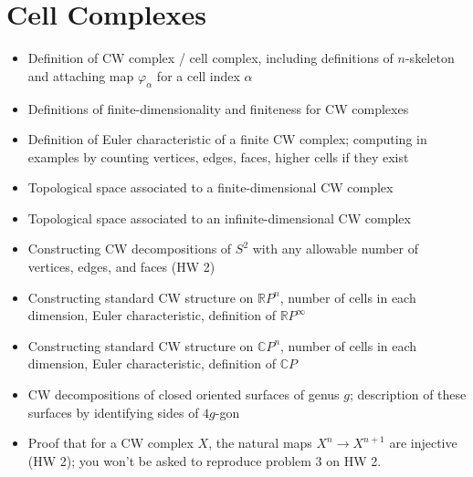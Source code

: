 \documentclass[12pt]{article}
\newcommand{\rl}{\mathbb{R}}
\newcommand{\mc}{\mathbb{C}}
\begin{document}
\section{Cell Complexes}
\begin{itemize}
\item Definition of CW complex / cell complex, including definitions of $n$-skeleton and
attaching map $\varphi_\alpha$ for a cell index $\alpha$


\vspace*{30mm}
\item Definitions of finite-dimensionality and finiteness for CW complexes


\vspace*{30mm}
\item Definition of Euler characteristic of a finite CW complex; computing in examples by
counting vertices, edges, faces, higher cells if they exist


\vspace*{30mm}
\item Topological space associated to a finite-dimensional CW complex


\vspace*{30mm}
\item Topological space associated to an infinite-dimensional CW complex


\vspace*{30mm}
\item Constructing CW decompositions of $S^2$ with any allowable number of vertices, edges,
and faces (HW 2)


\vspace*{30mm}
\item Constructing standard CW structure on $\rl P^n$, number of cells in each dimension,
Euler characteristic, definition of $\rl P^\infty$


\vspace*{30mm}
\item Constructing standard CW structure on $\mc P^n$, number of cells in each dimension,
Euler characteristic, definition of $\mc P$


\vspace*{30mm}
\item CW decompositions of closed oriented surfaces of genus $g$; description of these surfaces
by identifying sides of $4g$-gon


\vspace*{30mm}
\item Proof that for a CW complex $X$, the natural maps $X^n\to X^{n+1}$ are injective (HW
2); you won't be asked to reproduce problem 3 on HW 2.



\end{itemize}
\end{document}
